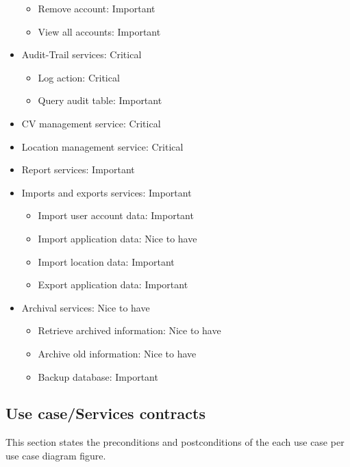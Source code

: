 \documentclass[12pt]{article}
\begin{document}
\begin{itemize}
\begin{itemize}
		\item Remove account: Important
		\item View all accounts: Important
	\end{itemize}
	\item Audit-Trail services: Critical
	\begin{itemize}
		\item Log action: Critical
		\item Query audit table: Important
	\end{itemize}
	\item CV management service: Critical
	\item Location management service: Critical
	\item Report services: Important
	\item Imports and exports services: Important
	\begin{itemize}
		\item Import user account data: Important
		\item Import application data: Nice to have
		\item Import location data: Important
		\item Export application data: Important
	\end{itemize}	
	\item Archival services: Nice to have
	\begin{itemize}
		\item Retrieve archived information: Nice to have
		\item Archive old information: Nice to have
		\item Backup database: Important
	\end{itemize}
\end{itemize}


\vspace{0.2in}

\subsection{Use case/Services contracts} %
\vspace{0.2in}

This section states the preconditions and postconditions of the each use case per use case diagram figure. \\
\end{document}

